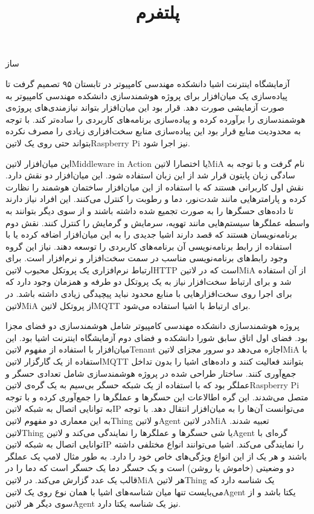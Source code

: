 \documentclass[]{assignment}
\title{پلتفرم}
\begin{document}
‌ساز


آزمایشگاه اینترنت اشیا دانشکده مهندسی کامپیوتر در تابستان ۹۵ تصمیم گرفت تا پیاده‌سازی یک میان‌افزار برای پروژه هوشمند‌سازی دانشکده مهندسی کامپیوتر به صورت آزمایشی صورت دهد.
قرار بود این میان‌افزار بتواند نیازمندی‌های پروژه‌ی هوشمندسازی را برآورده کرده و پیاده‌سازی برنامه‌های کاربردی را ساده‌تر کند. با توجه به محدودیت منابع قرار بود این پیاده‌سازی منابع سخت‌افزاری
زیادی را مصرف نکرده بتواند حتی روی یک ‌لاتین{Raspberry Pi} نیز اجرا شود.

این میان‌افزار ‌لاتین{Middleware in Action} یا اختصارا ‌لاتین{MiA} نام گرفت و
با توجه به سادگی زبان پایتون قرار شد از این زبان استفاده شود.
این میان‌افزار دو نقش دارد. نقش اول کاربرانی هستند که با استفاده از این میان‌افزار ساختمان هوشمند را نظارت کرده و پارامترهایی مانند شدت‌نور،
دما و رطوبت را کنترل می‌کنند. این افراد نیاز دارند تا داده‌های حسگرها را به صورت تجمیع شده داشته باشند و از سوی دیگر بتوانند به واسطه عملگرها سیستم‌هایی مانند
تهویه، سرمایش و گرمایش را کنترل کنند.
نقش دوم برنامه‌نویسان هستند که قصد دارند اشیا جدیدی را به این میان‌افزار اضافه کرده یا با استفاده از رابط برنامه‌نویسی آن برنامه‌های کاربردی را توسعه دهند.
نیاز این گروه وجود رابط‌های برنامه‌نویسی مناسب در سمت سخت‌افزار و نرم‌افزار است. برای ارتباط نرم‌افزاری یک پروتکل محبوب ‌لاتین{HTTP} است که در
‌لاتین{MiA} از آن استفاده شد و برای ارتباط سخت‌افزار نیاز به یک پروتکل دو طرفه و همزمان وجود دارد که برای اجرا روی سخت‌افزارهایی با
منابع محدود نباید پیچیدگی زیادی داشته باشد. در ‌لاتین{MiA} از پروتکل ‌لاتین{MQTT} برای ارتباط با اشیا استفاده می‌شود.

پروژه هوشمند‌سازی دانشکده مهندسی کامپیوتر شامل هوشمند‌سازی دو فضای مجزا بود. فضای اول اتاق سابق شورا دانشکده و فضای دوم آزمایشگاه اینترنت اشیا بود.
این میان‌افزار با استفاده از مفهوم ‌لاتین{Tenant} اجازه می‌دهد دو سرور مجزای ‌لاتین{MiA} با استفاده از یک گارگزار ‌لاتین{MQTT}
بتوانند فعالیت کنند و داده‌های اشیا را بدون تداخل جمع‌آوری کنند.
ساختار طراحی شده در پروژه هوشمند‌سازی شامل تعدادی حسگر و عملگر بود که با استفاده از یک شبکه حسگر بی‌سیم به یک گره‌ی ‌لاتین{Raspberry Pi}
متصل می‌شدند. این گره اطالاعات این حسگرها و عملگرها را جمع‌آوری کرده و با توجه به توانایی اتصال به شبکه ‌لاتین{IP} می‌توانست آن‌ها را به میان‌افزار انتقال دهد.
با توجه به این معماری دو مفهوم ‌لاتین{Thing} و ‌لاتین{Agent} در ‌لاتین{MiA} تعبیه شدند. ‌لاتین{Thing} یا شی حسگرها و عملگرها را نمایندگی می‌کند
و ‌لاتین{Agent} گره‌ای با توانایی اتصال به شبکه ‌لاتین{IP} را نمایندگی می‌کند.
اشیا می‌توانند انواع مختلفی داشته باشند و هر یک از این انواع ویژگی‌های خاص خود را دارد. به طور مثال لامپ یک عملگر دو وضعیتی (خاموش یا روشن)
است و یک حسگر دما یک حسگر است که دما را در قالب یک عدد گزارش می‌کند.
در ‌لاتین{MiA} هر ‌لاتین{Thing} یک شناسه دارد که می‌بایست تنها میان شناسه‌های اشیا با همان نوع روی یک ‌لاتین{Agent} یکتا باشد و از سوی دیگر هر ‌لاتین{Agent} نیز یک شناسه
یکتا دارد.
\end{document}
